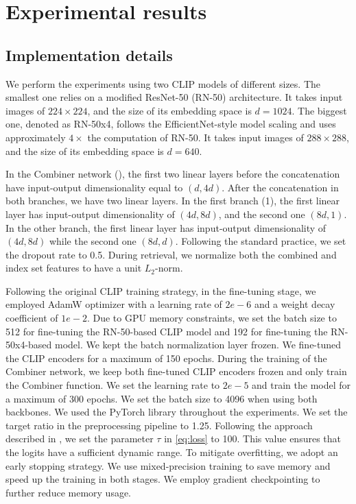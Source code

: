 \documentclass[acmlarge]{acmart}
\begin{document}
\section{Experimental results}\label{sec:experiments}
\subsection{Implementation details}
We perform the experiments using two CLIP models of different sizes. The smallest one relies on a modified ResNet-50 (RN-50) \cite{he2016deep} architecture. It takes input images of $224\times224$, and the size of its embedding space is $d=1024$. The biggest one, denoted as RN-50x4, follows the EfficientNet-style model scaling and uses approximately $4\times$ the computation of RN-50. It takes input images of $288\times288$, and the size of its embedding space is $d=640$.

In the Combiner network (), the first two linear layers before the concatenation have input-output dimensionality equal to $(d, 4d)$.
After the concatenation in both branches, we have two linear layers. In the first branch (1), the first linear layer has input-output dimensionality of $(4d, 8d)$, and the second one $(8d, 1)$.
In the other branch, the first linear layer has input-output dimensionality of $(4d, 8d)$ while the second one $(8d, d)$.
Following the standard practice, we set the dropout rate to 0.5.
During retrieval, we normalize both the combined and index set features to have a unit $L_2$-norm.

Following the original CLIP training strategy, in the fine-tuning stage, we employed AdamW optimizer \cite{loshchilov2018decoupled} with a learning rate of $2e-6$ and a weight decay coefficient of $1e-2$. 
Due to GPU memory constraints, we set the batch size to 512 for fine-tuning the RN-50-based CLIP model and 192 for fine-tuning the RN-50x4-based model.
We kept the batch normalization layer frozen.
We fine-tuned the CLIP encoders for a maximum of 150 epochs.
During the training of the Combiner network, we keep both fine-tuned CLIP encoders frozen and only train the Combiner function. We set the learning rate to $2e-5$ and train the model for a maximum of 300 epochs. We set the batch size to 4096 when using both backbones.
We used the PyTorch library throughout the experiments. We set the target ratio in the preprocessing pipeline to 1.25. 
Following the approach described in \cite{radford2021learning}, we set the parameter $\tau$ in \cref{eq:loss} to 100. This value ensures that the logits have a sufficient dynamic range.
To mitigate overfitting, we adopt an early stopping strategy. We use mixed-precision training \cite{micikevicius2018mixed} to save memory and speed up the training in both stages. We employ gradient checkpointing \cite{chen2016training} to further reduce memory usage.
\end{document}
